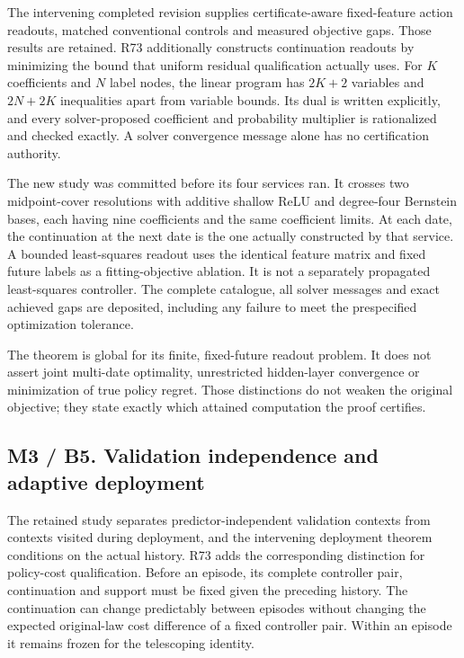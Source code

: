 \documentclass[ecta,nameyear,draft]{econsocart}
\begin{document}
The intervening completed revision supplies certificate-aware
fixed-feature action readouts, matched conventional controls and
measured objective gaps. Those results are retained. R73 additionally
constructs continuation readouts by minimizing the bound that uniform
residual qualification actually uses. For \(K\) coefficients and \(N\)
label nodes, the linear program has \(2K+2\) variables and \(2N+2K\)
inequalities apart from variable bounds. Its dual is written explicitly,
and every solver-proposed coefficient and probability multiplier is
rationalized and checked exactly. A solver convergence message alone has
no certification authority.

The new study was committed before its four services ran. It crosses two
midpoint-cover resolutions with additive shallow ReLU and degree-four
Bernstein bases, each having nine coefficients and the same coefficient
limits. At each date, the continuation at the next date is the one
actually constructed by that service. A bounded least-squares readout
uses the identical feature matrix and fixed future labels as a
fitting-objective ablation. It is not a separately propagated
least-squares controller. The complete catalogue, all solver messages
and exact achieved gaps are deposited, including any failure to meet the
prespecified optimization tolerance.

The theorem is global for its finite, fixed-future readout problem. It
does not assert joint multi-date optimality, unrestricted hidden-layer
convergence or minimization of true policy regret. Those distinctions do
not weaken the original objective; they state exactly which attained
computation the proof certifies.

\hypertarget{m3-b5.-validation-independence-and-adaptive-deployment}{%
\subsection{M3 / B5. Validation independence and adaptive
deployment}\label{m3-b5.-validation-independence-and-adaptive-deployment}}

The retained study separates predictor-independent validation contexts
from contexts visited during deployment, and the intervening deployment
theorem conditions on the actual history. R73 adds the corresponding
distinction for policy-cost qualification. Before an episode, its
complete controller pair, continuation and support must be fixed given
the preceding history. The continuation can change predictably between
episodes without changing the expected original-law cost difference of a
fixed controller pair. Within an episode it remains frozen for the
telescoping identity.
\end{document}
